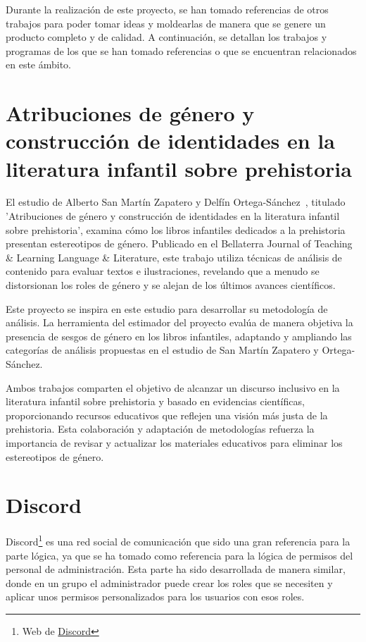 
Durante la realización de este proyecto, se han tomado referencias de otros trabajos para poder tomar ideas y moldearlas de manera que se genere un producto completo y de calidad. A continuación, se detallan los trabajos y programas de los que se han tomado referencias o que se encuentran relacionados en este ámbito.

\section{Atribuciones de género y construcción de identidades en la literatura infantil sobre prehistoria }

El estudio de Alberto San Martín Zapatero y Delfín Ortega-Sánchez~\cite{san2022atribuciones}, titulado 'Atribuciones de género y construcción de identidades en la literatura infantil sobre prehistoria', examina cómo los libros infantiles dedicados a la prehistoria presentan estereotipos de género. Publicado en el Bellaterra Journal of Teaching \& Learning Language \& Literature, este trabajo utiliza técnicas de análisis de contenido para evaluar textos e ilustraciones, revelando que a menudo se distorsionan los roles de género y se alejan de los últimos avances científicos.

Este proyecto se inspira en este estudio para desarrollar su metodología de análisis. La herramienta del estimador del proyecto evalúa de manera objetiva la presencia de sesgos de género en los libros infantiles, adaptando y ampliando las categorías de análisis propuestas en el estudio de San Martín Zapatero y Ortega-Sánchez.

Ambos trabajos comparten el objetivo de alcanzar un discurso inclusivo en la literatura infantil sobre prehistoria y basado en evidencias científicas, proporcionando recursos educativos que reflejen una visión más justa de la prehistoria. Esta colaboración y adaptación de metodologías refuerza la importancia de revisar y actualizar los materiales educativos para eliminar los estereotipos de género.

\section{Discord}

Discord\footnote{Web de \href{https://discord.com/}{ Discord}} es una red social de comunicación que sido una gran referencia para la parte lógica, ya que se ha tomado como referencia para la lógica de permisos del personal de administración. Esta parte ha sido desarrollada de manera similar, donde en un grupo el administrador puede crear los roles que se necesiten y aplicar unos permisos personalizados para los usuarios con esos roles.

